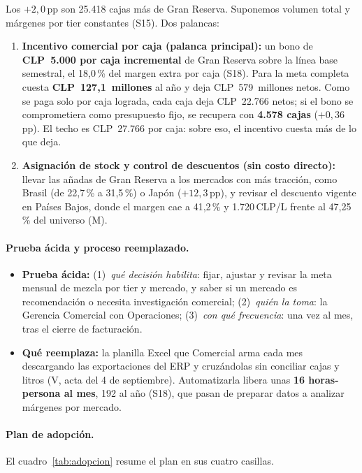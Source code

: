 \noindent Los $+2,0$\,pp son 25.418 cajas más de Gran Reserva. Suponemos volumen total y márgenes por tier constantes (S15). Dos palancas:
\begin{enumerate}\setlength\itemsep{1pt}
  \item \textbf{Incentivo comercial por caja (palanca principal):} un bono de \textbf{CLP~5.000 por caja incremental} de Gran Reserva sobre la línea base semestral, el 18,0\,\% del margen extra por caja (S18). Para la meta completa cuesta \textbf{CLP~127,1~millones} al año y deja CLP~579~millones netos. Como se paga solo por caja lograda, cada caja deja CLP~22.766 netos; si el bono se comprometiera como presupuesto fijo, se recupera con \textbf{4.578 cajas} ($+0,36$\,pp). El techo es CLP~27.766 por caja: sobre eso, el incentivo cuesta más de lo que deja.
  \item \textbf{Asignación de stock y control de descuentos (sin costo directo):} llevar las añadas de Gran Reserva a los mercados con más tracción, como Brasil (de 22,7\,\% a 31,5\,\%) o Japón ($+12,3$\,pp), y revisar el descuento vigente en Países Bajos, donde el margen cae a 41,2\,\% y 1.720\,CLP/L frente al 47,25\,\% del universo (M).
\end{enumerate}

\paragraph{Prueba ácida y proceso reemplazado.}
\begin{itemize}\setlength\itemsep{1pt}
  \item \textbf{Prueba ácida:} (1)~\emph{qué decisión habilita}: fijar, ajustar y revisar la meta mensual de mezcla por tier y mercado, y saber si un mercado es recomendación o necesita investigación comercial; (2)~\emph{quién la toma}: la Gerencia Comercial con Operaciones; (3)~\emph{con qué frecuencia}: una vez al mes, tras el cierre de facturación.
  \item \textbf{Qué reemplaza:} la planilla Excel que Comercial arma cada mes descargando las exportaciones del ERP y cruzándolas sin conciliar cajas y litros (V, acta del 4 de septiembre). Automatizarla libera unas \textbf{16 horas-persona al mes}, 192 al año (S18), que pasan de preparar datos a analizar márgenes por mercado.
\end{itemize}

\paragraph{Plan de adopción.}
El cuadro~\ref{tab:adopcion} resume el plan en sus cuatro casillas.

